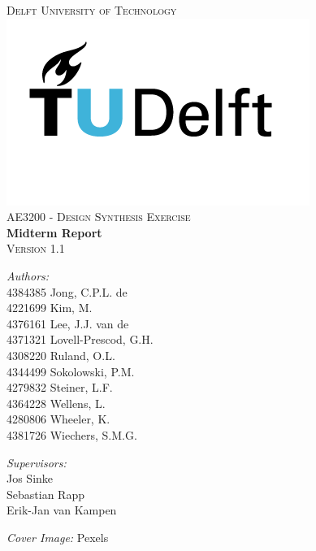 \begin{titlepage}
\begin{center}

\textsc{\LARGE Delft University of Technology}\\[1.5cm]
\includegraphics[scale=0.45]{TU_Delft_logo_RGB.png}\\[0.5cm]
\textsc{\Large AE3200 - Design Synthesis Exercise}\\[0.5cm]
{\huge\textbf{Midterm Report} \\[.2cm] \Large\textsc{Version 1.1}\\[1.0cm]}

\begin{minipage}[t]{0.4\textwidth}
\begin{flushleft} \large
\emph{Authors:}\\
    4384385  Jong, C.P.L. de\\
    4221699  Kim, M.\\
    4376161  Lee, J.J. van de\\
    4371321  Lovell-Prescod, G.H.\\
    4308220  Ruland, O.L.\\
    4344499  Sokolowski, P.M.\\
    4279832  Steiner, L.F.\\
    4364228  Wellens, L.\\
    4280806  Wheeler, K.\\
    4381726  Wiechers, S.M.G.
    

\end{flushleft}
\end{minipage}
\begin{minipage}[t]{0.4\textwidth}
\begin{flushright} \large
\emph{Supervisors:} \\
    Jos Sinke\\
    Sebastian Rapp\\
    Erik-Jan van Kampen
    
    
\end{flushright}
\end{minipage}
\vfill
\textit{Cover Image:} Pexels\\
\small
\url{}

\end{center}
\end{titlepage}
\restoregeometry
